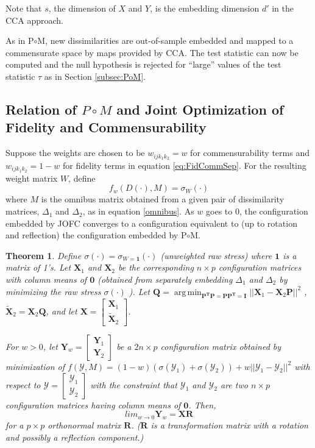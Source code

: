 \documentclass[11pt]{article} %
\DeclareMathOperator*{\argmin}{arg\,min}
\newcommand{\mcY}{\mathcal{Y}}
\newtheorem{thm}{Theorem}
\begin{document}
Note that $s$, the dimension of $X$ and $Y$, is the embedding dimension $d'$  in the CCA approach. 


As in P$ \circ $M, new dissimilarities are out-of-sample embedded and mapped to a commensurate  space by maps provided by CCA. The test statistic   can now be computed and  the null hypothesis is rejected for ``large'' values of the test statistic $\tau$  as in Section \ref{subsec:PoM}.


\subsection{Relation of $P\circ M$ and Joint Optimization of Fidelity and Commensurability} 

Suppose the weights are chosen to be $w_{ijk_1k_2}=w$ for commensurability terms and $w_{ijk_1k_2}=1-w$ for fidelity terms in equation \eqref{eq:FidCommSep}. For the resulting weight matrix $W$, define 
\begin{equation}
f_w(D(\cdot),M) = \sigma_W(\cdot) \label{fid-comm-tradeoff-func}
\end{equation}
 where $M$ is the omnibus matrix obtained from  a given pair of dissimilarity matrices, $\Delta_1$ and $\Delta_2$, as in equation \eqref{omnibus}.   As $w$ goes to 0, the configuration embedded by JOFC converges to a configuration equivalent to (up to rotation and reflection)  the configuration embedded by P$\circ$M.


\begin{thm}
Define $\sigma(\cdot)=\sigma_{W=\bm{1}}(\cdot)$ (unweighted raw stress) where $\bm{1}$ is a matrix of 1's.
 Let $\mathbf{X}_1$ and $\mathbf{X}_2$ be the corresponding $n\times p$ configuration matrices with column means of $\bm{0}$ (obtained from separately embedding  $\Delta_1$ and $\Delta_2$ by minimizing the raw stress $\sigma(\cdot)$ ). 
Let  $\mathbf{Q}=\argmin_{\mathbf{P^T}\mathbf{P}=\mathbf{P}\mathbf{P^T}=\mathbf{I}}||{\mathbf{X}_1-\mathbf{X}_2}\mathbf{P}||^2$ ,   $\mathbf{\tilde{X}}_2= \mathbf{X}_2\mathbf{Q}$, 
and let  
$\mathbf{X}=\left[\begin{array}{c}
\mathbf{X}_1\\
\mathbf{\tilde{X}}_2
\end{array}\right]$.

For $w>0$, let $\mathbf{Y}_{w} = \left[\begin{array}{c}
\mathbf{Y}_1\\
\mathbf{Y}_2
\end{array}\right]$  be  a $2n \times p$ configuration matrix obtained by minimization of 
$ f(\mcY, M) =(1-w)\left({\sigma{(\mcY_1)}}+{\sigma{(\mcY_2)}}\right)+w||{\mcY_1-\mcY_2}||^2 $ with respect to  $\mcY=\left[\begin{array}{c}
\mcY_1\\
\mcY_2
\end{array}\right]$ with the constraint that $\mcY_1$ and $\mcY_2$ are two $n \times p$ configuration matrices having column means of $\bm{0}$. Then, $$lim_{w\rightarrow0}\mathbf{Y}_{w}=\mathbf{X}\mathbf{R}$$ for a $p\times p$ orthonormal matrix $\mathbf{R}$. ($\mathbf{R}$ is a transformation matrix with a rotation and possibly a reflection component.)
\end{thm}
 
\end{document}
